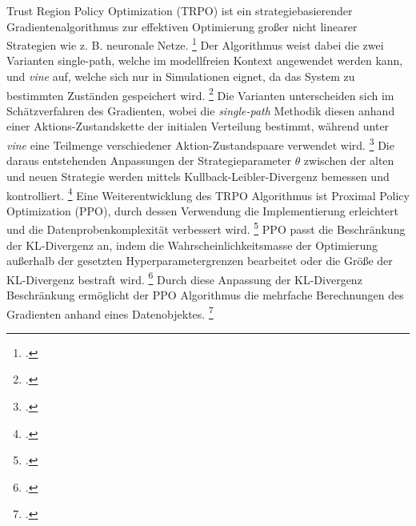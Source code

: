 Trust Region Policy Optimization (TRPO) ist ein strategiebasierender Gradientenalgorithmus zur effektiven Optimierung großer nicht linearer Strategien wie z. B. neuronale Netze. \footcite[Vgl.][S. 1]{Schulman.2015}
Der Algorithmus weist dabei die zwei Varianten single-path, welche im modellfreien Kontext angewendet werden kann, und \textit{vine} auf, welche sich nur in Simulationen eignet, da das System zu bestimmten Zuständen gespeichert wird. \footcite[Vgl.][S. 1]{Schulman.2015}
Die Varianten unterscheiden sich im Schätzverfahren des Gradienten, wobei die \textit{single-path} Methodik diesen anhand einer Aktions-Zustandskette der initialen Verteilung bestimmt, während unter \textit{vine} eine Teilmenge verschiedener Aktion-Zustandspaare verwendet wird. \footcite[Vgl.][S. 4]{Schulman.2015}
Die daraus entstehenden Anpassungen der Strategieparameter $\theta$ zwischen der alten und neuen Strategie werden mittels Kullback-Leibler-Divergenz bemessen und kontrolliert. \footcite[Vgl.][S. 4]{Huang.2017}
Eine Weiterentwicklung des TRPO Algorithmus ist Proximal Policy Optimization (PPO), durch dessen Verwendung die Implementierung erleichtert und die Datenprobenkomplexität verbessert wird. \footcite[Vgl.][S. 1]{Schulman.2017}
PPO passt die Beschränkung der KL-Divergenz an, indem die Wahrscheinlichkeitsmasse der Optimierung außerhalb der gesetzten Hyperparametergrenzen bearbeitet oder die Größe der KL-Divergenz bestraft wird. \footcite[Vgl.][S. 3f.]{Schulman.2017}
Durch diese Anpassung der KL-Divergenz Beschränkung ermöglicht der PPO Algorithmus die mehrfache Berechnungen des Gradienten anhand eines Datenobjektes. \footcite[Vgl.][S. 4]{Schulman.2017}


